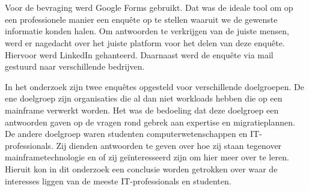 \section{}
\label{sec:De bevraging}

Voor de bevraging werd Google Forms gebruikt. Dat was de ideale tool om op een professionele manier een enquête op te stellen waaruit we de gewenste informatie konden halen. Om antwoorden te verkrijgen van de juiste mensen, werd er nagedacht over het juiste platform voor het delen van deze enquête. Hiervoor werd LinkedIn gehanteerd. Daarnaast werd de enquête via mail gestuurd naar verschillende bedrijven. 

In het onderzoek zijn twee enquêtes opgesteld voor verschillende doelgroepen. De ene doelgroep zijn organisaties die al dan niet workloads hebben die op een mainframe verwerkt worden. Het was de bedoeling dat deze doelgroep een antwoorden gaven op de vragen rond gebrek aan expertise en migratieplannen. De andere doelgroep waren studenten computerwetenschappen en IT-professionals. Zij dienden antwoorden te geven over hoe zij staan tegenover mainframetechnologie en of zij geïnteresseerd zijn om hier meer over te leren. Hieruit kon in dit onderzoek een conclusie worden getrokken over waar de interesses liggen van de meeste IT-professionals en studenten.

